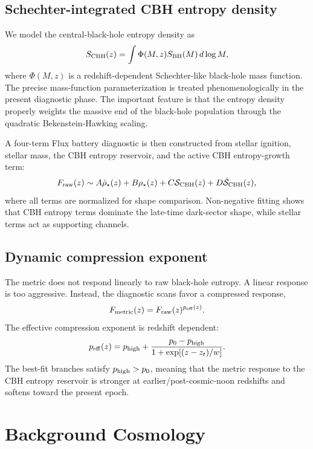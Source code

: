 \documentclass[11pt,a4paper]{article}
\begin{document}
\subsection{Schechter-integrated CBH entropy density}

We model the central-black-hole entropy density as
\begin{equation}
S_{\rm CBH}(z)=\int \Phi(M,z)S_{\rm BH}(M)\,d\log M,
\end{equation}
where $\Phi(M,z)$ is a redshift-dependent Schechter-like black-hole mass function. The precise mass-function parameterization is treated phenomenologically in the present diagnostic phase. The important feature is that the entropy density properly weights the massive end of the black-hole population through the quadratic Bekenstein-Hawking scaling.

A four-term Flux battery diagnostic is then constructed from stellar ignition, stellar mass, the CBH entropy reservoir, and the active CBH entropy-growth term:
\begin{equation}
F_{\rm raw}(z)\sim
A\dot\rho_\star(z)+B\rho_\star(z)+C\mathcal{S}_{\rm CBH}(z)+D\dot{\mathcal{S}}_{\rm CBH}(z),
\end{equation}
where all terms are normalized for shape comparison. Non-negative fitting shows that CBH entropy terms dominate the late-time dark-sector shape, while stellar terms act as supporting channels.

\subsection{Dynamic compression exponent}

The metric does not respond linearly to raw black-hole entropy. A linear response is too aggressive. Instead, the diagnostic scans favor a compressed response,
\begin{equation}
F_{\rm metric}(z)=F_{\rm raw}(z)^{p_{\rm eff}(z)}.
\end{equation}
The effective compression exponent is redshift dependent:
\begin{equation}
p_{\rm eff}(z)=p_{\rm high}+\frac{p_0-p_{\rm high}}{1+\exp[(z-z_t)/w]}.
\end{equation}
The best-fit branches satisfy $p_{\rm high}>p_0$, meaning that the metric response to the CBH entropy reservoir is stronger at earlier/post-cosmic-noon redshifts and softens toward the present epoch.

\section{Background Cosmology}
\end{document}
